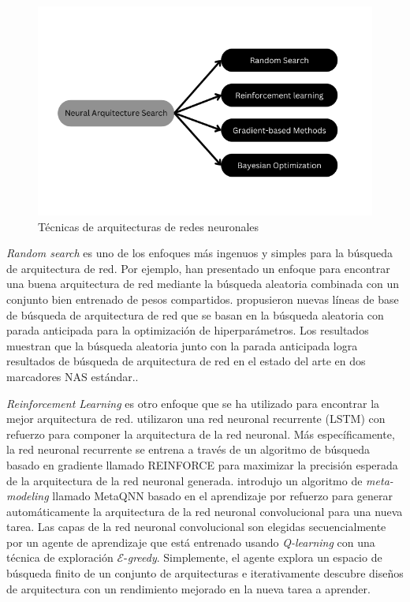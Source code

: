 \begin{figure}[H]
    \center 
    \includegraphics[scale=0.4]{images/NAS.png}
    \caption{Técnicas de arquitecturas de redes neuronales}
\end{figure}

\textit{Random search} es uno de los enfoques más ingenuos y simples para la búsqueda de arquitectura de red. Por ejemplo, \parencite{40} han presentado un enfoque para encontrar una buena arquitectura de red mediante la búsqueda aleatoria combinada con un conjunto bien entrenado de pesos compartidos. \parencite{41} propusieron nuevas líneas de base de búsqueda de arquitectura de red que se basan en la búsqueda aleatoria con parada anticipada para la optimización de hiperparámetros. Los resultados muestran que la búsqueda aleatoria junto con la parada anticipada logra resultados de búsqueda de arquitectura de red en el estado del arte en dos marcadores NAS estándar..

\textit{Reinforcement Learning} \parencite{42} es otro enfoque que se ha utilizado para encontrar la mejor arquitectura de red. \parencite{43} utilizaron una red neuronal recurrente (LSTM) con refuerzo para componer la arquitectura de la red neuronal. Más específicamente, la red neuronal recurrente se entrena a través de un algoritmo de búsqueda basado en gradiente llamado REINFORCE \parencite{44} para maximizar la precisión esperada de la arquitectura de la red neuronal generada. \parencite{45} introdujo un algoritmo de \textit{meta-modeling} llamado MetaQNN basado en el aprendizaje por refuerzo para generar automáticamente la arquitectura de la red neuronal convolucional para una nueva tarea. Las capas de la red neuronal convolucional son elegidas secuencialmente por un agente de aprendizaje que está entrenado usando \textit{Q-learning} con una técnica de exploración $\mathcal{E}$-\textit{greedy}. Simplemente, el agente explora un espacio de búsqueda finito de un conjunto de arquitecturas e iterativamente descubre diseños de arquitectura con un rendimiento mejorado en la nueva tarea a aprender.

